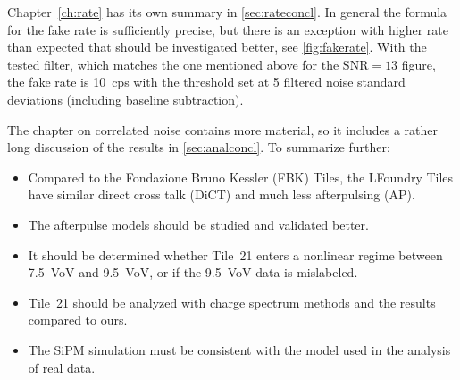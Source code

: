 
Chapter~\ref{ch:rate} has its own summary in \autoref{sec:rateconcl}. In
general the formula for the fake rate is sufficiently precise, but there is an
exception with higher rate than expected that should be investigated better,
see \autoref{fig:fakerate}. With the tested filter, which matches the one
mentioned above for the $\mathrm{SNR} = 13$ figure, the fake rate is
\SI{10}{cps} with the threshold set at 5 filtered noise standard deviations
(including baseline subtraction).


The chapter on correlated noise contains more material, so it includes a rather
long discussion of the results in \autoref{sec:analconcl}. To summarize
further:

\begin{itemize}
    
    \item Compared to the Fondazione Bruno Kessler (FBK) Tiles, the LFoundry
    Tiles have similar direct cross talk (DiCT) and much less afterpulsing (AP).
    
    \item The afterpulse models should be studied and validated better.
    
    \item It should be determined whether Tile~21 enters a nonlinear regime
    between \SI{7.5}{VoV} and \SI{9.5}{VoV}, or if the \SI{9.5}{VoV} data is
    mislabeled.
    
    \item Tile~21 should be analyzed with charge spectrum methods and the
    results compared to ours.
    
    \item The SiPM simulation must be consistent with the model used in the
    analysis of real data.
    
\end{itemize}

